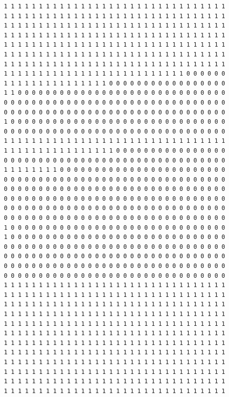 \documentclass [10 pt, a4 paper]{report}
\begin{document}
\begin{lstlisting}[caption=Output of the simulation once it is finished, label={lst:code1}, frame=single]
1 1 1 1 1 1 1 1 1 1 1 1 1 1 1 1 1 1 1 1 1 1 1 1 1 1 1 1 1 1 1 1
1 1 1 1 1 1 1 1 1 1 1 1 1 1 1 1 1 1 1 1 1 1 1 1 1 1 1 1 1 1 1 1
1 1 1 1 1 1 1 1 1 1 1 1 1 1 1 1 1 1 1 1 1 1 1 1 1 1 1 1 1 1 1 1
1 1 1 1 1 1 1 1 1 1 1 1 1 1 1 1 1 1 1 1 1 1 1 1 1 1 1 1 1 1 1 1
1 1 1 1 1 1 1 1 1 1 1 1 1 1 1 1 1 1 1 1 1 1 1 1 1 1 1 1 1 1 1 1
1 1 1 1 1 1 1 1 1 1 1 1 1 1 1 1 1 1 1 1 1 1 1 1 1 1 1 1 1 1 1 1
1 1 1 1 1 1 1 1 1 1 1 1 1 1 1 1 1 1 1 1 1 1 1 1 1 1 1 1 1 1 1 1
1 1 1 1 1 1 1 1 1 1 1 1 1 1 1 1 1 1 1 1 1 1 1 1 1 1 0 0 0 0 0 0
1 1 1 1 1 1 1 1 1 1 1 1 1 1 1 0 0 0 0 0 0 0 0 0 0 0 0 0 0 0 0 0
1 1 0 0 0 0 0 0 0 0 0 0 0 0 0 0 0 0 0 0 0 0 0 0 0 0 0 0 0 0 0 0
0 0 0 0 0 0 0 0 0 0 0 0 0 0 0 0 0 0 0 0 0 0 0 0 0 0 0 0 0 0 0 0
0 0 0 0 0 0 0 0 0 0 0 0 0 0 0 0 0 0 0 0 0 0 0 0 0 0 0 0 0 0 0 0
1 0 0 0 0 0 0 0 0 0 0 0 0 0 0 0 0 0 0 0 0 0 0 0 0 0 0 0 0 0 0 0
0 0 0 0 0 0 0 0 0 0 0 0 0 0 0 0 0 0 0 0 0 0 0 0 0 0 0 0 0 0 0 0
1 1 1 1 1 1 1 1 1 1 1 1 1 1 1 1 1 1 1 1 1 1 1 1 1 1 1 1 1 1 1 1
1 1 1 1 1 1 1 1 1 1 1 1 1 1 1 1 0 0 0 0 0 0 0 0 0 0 0 0 0 0 0 0
0 0 0 0 0 0 0 0 0 0 0 0 0 0 0 0 0 0 0 0 0 0 0 0 0 0 0 0 0 0 0 0
1 1 1 1 1 1 1 1 0 0 0 0 0 0 0 0 0 0 0 0 0 0 0 0 0 0 0 0 0 0 0 0
0 0 0 0 0 0 0 0 0 0 0 0 0 0 0 0 0 0 0 0 0 0 0 0 0 0 0 0 0 0 0 0
0 0 0 0 0 0 0 0 0 0 0 0 0 0 0 0 0 0 0 0 0 0 0 0 0 0 0 0 0 0 0 0
0 0 0 0 0 0 0 0 0 0 0 0 0 0 0 0 0 0 0 0 0 0 0 0 0 0 0 0 0 0 0 0
0 0 0 0 0 0 0 0 0 0 0 0 0 0 0 0 0 0 0 0 0 0 0 0 0 0 0 0 0 0 0 0
0 0 0 0 0 0 0 0 0 0 0 0 0 0 0 0 0 0 0 0 0 0 0 0 0 0 0 0 0 0 0 0
1 0 0 0 0 0 0 0 0 0 0 0 0 0 0 0 0 0 0 0 0 0 0 0 0 0 0 0 0 0 0 0
1 0 0 0 0 0 0 0 0 0 0 0 0 0 0 0 0 0 0 0 0 0 0 0 0 0 0 0 0 0 0 0
0 0 0 0 0 0 0 0 0 0 0 0 0 0 0 0 0 0 0 0 0 0 0 0 0 0 0 0 0 0 0 0
0 0 0 0 0 0 0 0 0 0 0 0 0 0 0 0 0 0 0 0 0 0 0 0 0 0 0 0 0 0 0 0
0 0 0 0 0 0 0 0 0 0 0 0 0 0 0 0 0 0 0 0 0 0 0 0 0 0 0 0 0 0 0 0
0 0 0 0 0 0 0 0 0 0 0 0 0 0 0 0 0 0 0 0 0 0 0 0 0 0 0 0 0 0 0 0
1 1 1 1 1 1 1 1 1 1 1 1 1 1 1 1 1 1 1 1 1 1 1 1 1 1 1 1 1 1 1 1
1 1 1 1 1 1 1 1 1 1 1 1 1 1 1 1 1 1 1 1 1 1 1 1 1 1 1 1 1 1 1 1
1 1 1 1 1 1 1 1 1 1 1 1 1 1 1 1 1 1 1 1 1 1 1 1 1 1 1 1 1 1 1 1
1 1 1 1 1 1 1 1 1 1 1 1 1 1 1 1 1 1 1 1 1 1 1 1 1 1 1 1 1 1 1 1
1 1 1 1 1 1 1 1 1 1 1 1 1 1 1 1 1 1 1 1 1 1 1 1 1 1 1 1 1 1 1 1
1 1 1 1 1 1 1 1 1 1 1 1 1 1 1 1 1 1 1 1 1 1 1 1 1 1 1 1 1 1 1 1
1 1 1 1 1 1 1 1 1 1 1 1 1 1 1 1 1 1 1 1 1 1 1 1 1 1 1 1 1 1 1 1
1 1 1 1 1 1 1 1 1 1 1 1 1 1 1 1 1 1 1 1 1 1 1 1 1 1 1 1 1 1 1 1
1 1 1 1 1 1 1 1 1 1 1 1 1 1 1 1 1 1 1 1 1 1 1 1 1 1 1 1 1 1 1 1
1 1 1 1 1 1 1 1 1 1 1 1 1 1 1 1 1 1 1 1 1 1 1 1 1 1 1 1 1 1 1 1
1 1 1 1 1 1 1 1 1 1 1 1 1 1 1 1 1 1 1 1 1 1 1 1 1 1 1 1 1 1 1 1
1 1 1 1 1 1 1 1 1 1 1 1 1 1 1 1 1 1 1 1 1 1 1 1 1 1 1 1 1 1 1 1

\end{lstlisting}
\end{document}
